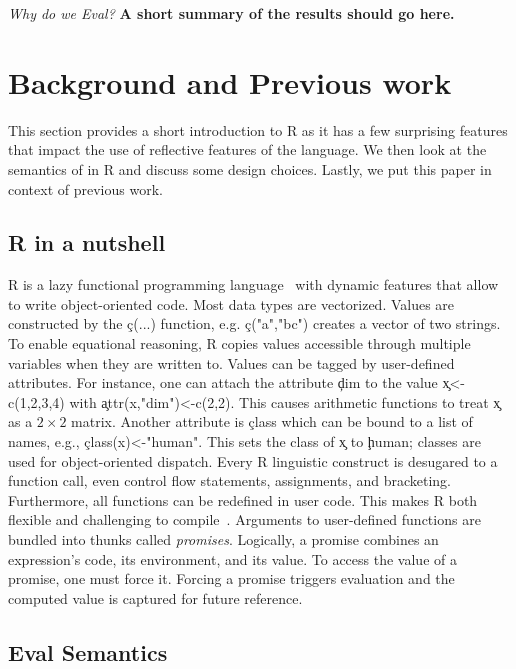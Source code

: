 \documentclass[USenglish,cleveref, autoref, thm-restate]{lipics-v2019}
\begin{document}
\vspace{2mm}\noindent\emph{Why do we Eval?} {\bf A short summary of the
results should go here.}


\section{Background and Previous work}

This section provides a short introduction to R as it has a few
surprising features that impact the use of reflective features of the
language. We then look at the semantics of \eval in R and discuss some
design choices. Lastly, we put this paper in context of previous work.

\subsection{R in a nutshell}

R is a lazy functional programming language~\cite{ecoop12} with
dynamic features that allow to write object-oriented code. Most data
types are vectorized. Values are constructed by the \c{c(...)}
function, e.g. \c{c("a","bc")} creates a vector of two strings. To
enable equational reasoning, R copies values accessible through
multiple variables when they are written to. Values can be tagged by
user-defined attributes. For instance, one can attach the attribute
\c{dim} to the value \c{x<-c(1,2,3,4)} with \c{attr(x,"dim")<-c(2,2)}.
This causes arithmetic functions to treat \c x as a $2 \times 2$
matrix. Another attribute is \c{class} which can be bound to a list of
names, e.g., \c{class(x)<-"human"}. This sets the class of \c{x} to
\c{human}; classes are used for object-oriented dispatch. Every R
linguistic construct is desugared to a function call, even control
flow statements, assignments, and bracketing. Furthermore, all
functions can be redefined in user code. This makes R both flexible
and challenging to compile~\cite{dls19}. Arguments to user-defined
functions are bundled into thunks called \emph{promises}. Logically, a
promise combines an expression's code, its environment, and its value.
To access the value of a promise, one must force it. Forcing a promise
triggers evaluation and the computed value is captured for future
reference.


\subsection{Eval Semantics}
\end{document}
